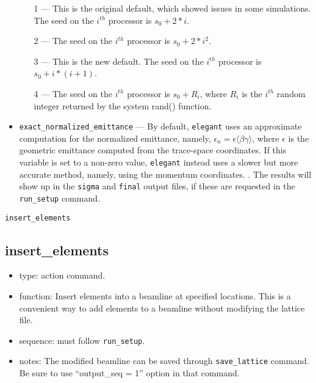 \documentclass[11pt]{article}
\begin{document}
\begin{itemize}
\begin{itemize}
    \item[1] --- This is the original default, which showed issues in some simulations. The seed on the $i^{th}$ processor is $s_0+2*i$.
    \item[2] --- The seed on the $i^{th}$ processor is $s_0+2*i^2$.
    \item[3] --- This is the new default. The seed on the $i^{th}$ processor is $s_0+i*(i+1)$.
    \item[4] --- The seed on the $i^{th}$ processor is $s_0+R_i$, where $R_i$ is the $i^{th}$ random integer returned by
      the system rand() function.
    \end{itemize}
\item \verb|exact_normalized_emittance| --- By default, \verb|elegant| uses an approximate computation for the normalized emittance, namely,
$\epsilon_n = \epsilon\langle\beta\gamma\rangle$, where $\epsilon$ is the geometric emittance computed from the trace-space coordinates.
If this variable is set to a non-zero value, \verb|elegant| instead uses a slower but more accurate method, namely, using the momentum coordinates.
\cite{Floettmann-PRSTAB6-034202}. The results will show up in the \verb|sigma| and \verb|final| output files, if these are requested in the \verb|run_setup| command.
  \end{itemize}

\newpage
\begin{center}{\Large\verb|insert_elements|}\end{center}
\subsection{insert\_elements \label{subsec:insertelements}}

\begin{itemize}
\item type: action command.
\item function: Insert elements into a beamline at specified locations. This is a convenient way to
 add elements to a beamline without modifying the lattice file.
\item sequence: must follow \verb|run_setup|.
\item notes: 
	The modified beamline can be saved through \verb|save_lattice|
   command. Be sure to use ``output\_seq = 1'' option in that command.  
\end{itemize}
\end{document}
